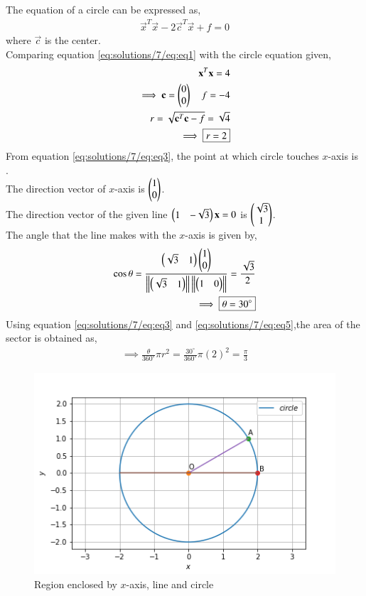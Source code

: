 The equation of a circle can be expressed as,
\begin{align}
    \vec{x}^{T}\vec{x} - 2\vec{c}^{T}\vec{x} +f=0 \label{eq:solutions/7/eq:eq1}
\end{align}
where $\vec{c}$ is the center.\\
Comparing equation \eqref{eq:solutions/7/eq:eq1} with the circle equation given,
\begin{align}
    \mathbf{x}^{T}\mathbf{x} =4 \label{eq:solutions/7/eq:eq2}\\
    \implies \mathbf{c} = \begin{pmatrix}0\\0\end{pmatrix} \quad f=-4\\
    r=\sqrt{\mathbf{c}^{T}\mathbf{c}-f} = \sqrt{4}\\
    \implies \boxed{r=2} \label{eq:solutions/7/eq:eq3}
\end{align}
From equation \eqref{eq:solutions/7/eq:eq3}, the point at which circle touches $x$-axis is .\\
The direction vector of $x$-axis is $\begin{pmatrix}1\\0\end{pmatrix}$.\\
The direction vector of the given line $\begin{pmatrix}1&-\sqrt{3}\end{pmatrix}\mathbf{x}=0$ is $\begin{pmatrix}\sqrt{3}\\1\end{pmatrix}$.\\
The angle that the line makes with the $x$-axis is given by,
\begin{align}
    \cos\theta = \frac{\begin{pmatrix}\sqrt{3}&1\end{pmatrix}\begin{pmatrix}1\\0\end{pmatrix}}{\left\lVert\begin{pmatrix}\sqrt{3}&1\end{pmatrix}\right\rVert\left\lVert\begin{pmatrix}1&0\end{pmatrix}\right\rVert}=\frac{\sqrt{3}}{2} \label{eq:solutions/7/eq:eq4}\\
    \implies \boxed{\theta = 30^{\circ}}\label{eq:solutions/7/eq:eq5}
\end{align}
Using equation \eqref{eq:solutions/7/eq:eq3} and \eqref{eq:solutions/7/eq:eq5},the area of the sector is obtained as,
\begin{align}
    \implies \boxed{\frac{\theta}{360^{\circ}}\pi r^2 = \frac{30^{\circ}}{360^{\circ}}\pi (2)^2=\frac{\pi}{3}} \label{eq:solutions/7/eq:eq6}
\end{align}
\renewcommand{\thefigure}{\arabic{figure}}
\begin{figure}[h!]
	\centering
	\includegraphics[width=\columnwidth]{./solutions/1/7/circle.png}
	\caption{Region enclosed by $x$-axis, line and circle}
	\label{eq:solutions/7/myfig}
\end{figure}\\
